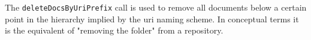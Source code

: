 The \verb+deleteDocsByUriPrefix+ call is used to remove all documents below a certain
point in the hierarchy implied by the uri naming scheme. In conceptual terms it is
the equivalent of "removing the folder" from a repository.
